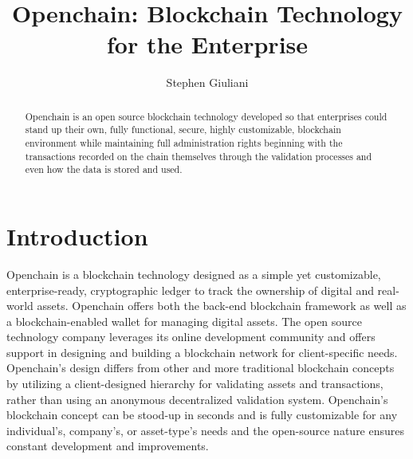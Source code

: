 
\title{Openchain: Blockchain Technology for the Enterprise}


\author{Stephen Giuliani}

\renewcommand{\shortauthors}{S. Giuliani}

\begin{abstract}
Openchain is an open source blockchain technology developed so that enterprises could stand up their own, fully functional, secure, highly customizable, blockchain environment while maintaining full administration rights beginning with the transactions recorded on the chain themselves through the validation processes and even how the data is stored and used.
\end{abstract}


\maketitle

\section{Introduction}
Openchain is a blockchain technology designed as a simple yet customizable, enterprise-ready, cryptographic ledger to track the ownership of digital and real-world assets. Openchain offers both the back-end blockchain framework as well as a blockchain-enabled wallet for managing digital assets. The open source technology company leverages its online development community and offers support in designing and building a blockchain network for client-specific needs. Openchain's design differs from other and more traditional blockchain concepts by utilizing a client-designed hierarchy for validating assets and transactions, rather than using an anonymous decentralized validation system. Openchain's blockchain concept can be stood-up in seconds and is fully customizable for any individual's, company's, or asset-type's needs and the open-source nature ensures constant development and improvements.

